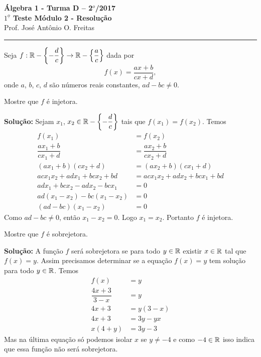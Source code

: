 \documentclass[12pt]{article}
\begin{document}


\begin{center}
{\Large\bf {\'A}lgebra 1 - Turma D -- 2$^{o}$/2017} \\ \vspace{9pt} {\large\bf
  $1^{\underline{o}}$ Teste Módulo 2 - Resolu\c{c}\~ao}\\
\vspace{9pt} Prof. Jos{\'e} Ant{\^o}nio O. Freitas
\end{center}
\hrule

\vspace{.6cm}

Seja $f : \mathbb{R} - \left\{-\dfrac{d}{c}\right\} \to \mathbb{R}  - \left\{\dfrac{a}{c}\right\}$ dada por
\[
	f(x) =  \dfrac{ax + b}{cx + d},
\]
onde $a$, $b$, $c$, $d$ s{\~a}o n{\'u}meros reais constantes, $ad - bc \ne 0$.
\vspace{.5cm}

\questao Mostre que $f$ é injetora.

\noindent\textbf{Solu\c{c}\~ao:} Sejam $x_1$, $x_2 \in \mathbb{R} - \left\{-\dfrac{d}{c}\right\}$ tais que $f(x_1) = f(x_2)$. Temos
\begin{align*}
	f(x_1) &= f(x_2)\\
	\dfrac{ax_1 + b}{cx_1 + d} &= \dfrac{ax_2 + b}{cx_2 + d}\\
	(ax_1 + b)(cx_2 + d) &= (ax_2 + b)(cx_1 + d)\\
	acx_1x_2 + adx_1 + bcx_2 + bd &= acx_1x_2 + adx_2 + bcx_1 + bd\\
	adx_1 + bcx_2 - adx_2 - bcx_1 &= 0\\
	ad(x_1 - x_2) - bc(x_1 - x_2)&= 0\\
	(ad - bc)(x_1 - x_2) &= 0
\end{align*}
Como $ad - bc \ne 0$, então $x_1 - x_2 = 0$. Logo $x_1 = x_2$. Portanto $f$ é injetora.

\vspace{.5cm}

\questao Mostre que $f$ é sobrejetora.

\noindent\textbf{Solu\c{c}\~ao:} A função $f$ será sobrejetora se para todo $y \in \mathbb{R}$ existir $x \in \mathbb{R}$ tal que $f(x) = y$. Assim precisamos determinar se a equação $f(x) = y$ tem solução para todo $y \in \mathbb{R}$.
Temos
\begin{align*}
	f(x) &= y\\
	\dfrac{4x + 3}{3 - x} &= y\\
	4x + 3 &= y(3 - x)\\
	4x + 3 &= 3y - yx\\
	x(4 + y) &= 3y - 3
\end{align*}
Mas na última equação só podemos isolar $x$ se $y \ne -4$ e como $-4 \in \mathbb{R}$ isso indica que essa função não será sobrejetora.
\end{document}
